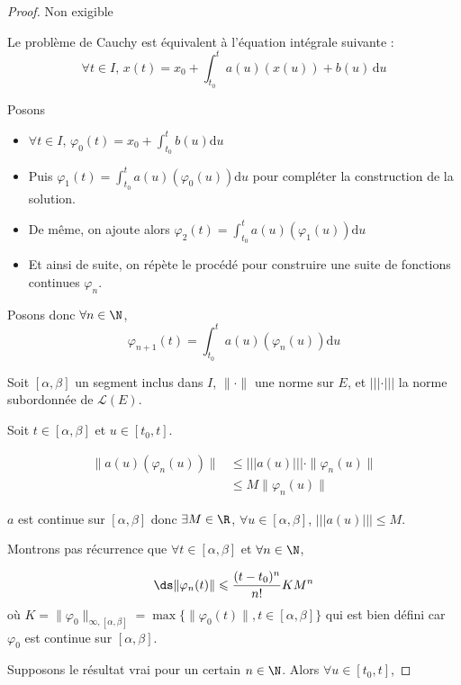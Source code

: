 \begin{proof} Non exigible 


    Le problème de Cauchy est équivalent à l'équation intégrale suivante :
    $$\forall t \in I, \, x(t) = x_0 + \int_{t_0}^{t} a(u)(x(u)) + b(u) \, \mathrm d u$$

    Posons
    \begin{itemize}
        \item $\forall t \in I, \, \varphi_0(t) = x_0 + \int_{t_0}^{t} b(u) \mathrm d u$
        \item Puis $\varphi_1(t) = \int_{t_0}^{t} a(u)(\varphi_0(u)) \mathrm d u$ pour compléter la construction de la solution.
        \item De même, on ajoute alors $\varphi_2(t) = \int_{t_0}^{t} a(u)(\varphi_1(u)) \mathrm d u$
        \item Et ainsi de suite, on répète le procédé pour construire une suite de fonctions continues $\varphi_n$.
    \end{itemize} 
    Posons donc $\forall n \in \N$, $$\varphi_{n + 1}(t) = \int_{t_0}^{t} a(u)(\varphi_n(u)) \mathrm d u$$

    Soit $[\alpha, \beta]$ un segment inclus dans $I$, $\| \cdot \|$ une norme sur $E$, et 
    $||| \cdot |||$ la norme subordonnée de $\mathscr L(E)$.

    Soit $t \in [\alpha, \beta]$ et $u \in [t_0, t]$. 

    \begin{align}
        \| a(u)(\varphi_n(u)) \| & \leqslant ||| a(u) ||| \cdot \| \varphi_n(u) \| \\
        & \leqslant M \| \varphi_n(u) \|
    \end{align}

    $a$ est continue sur $[\alpha, \beta]$ donc $\exists M \in \R$, $\forall u \in [\alpha, \beta]$, 
    $||| a(u) ||| \leqslant M$.

    Montrons pas récurrence que $\forall t \in [\alpha, \beta]$ et $\forall n \in \N$, 

    $$\ds \| \varphi_n(t) \| \leqslant \frac{(t - t_0)^n}{n!} K M^n$$
    où $K = \| \varphi_0 \|_{\infty, [\alpha, \beta]} = \max \{ \| \varphi_0(t) \|, t \in [\alpha, \beta] \}$ qui
    est bien défini car $\varphi_0$ est continue sur $[\alpha, \beta]$.

    Supposons le résultat vrai pour un certain $n \in \N$. Alors 
    $\forall u \in [t_0, t]$, 


\end{proof}
